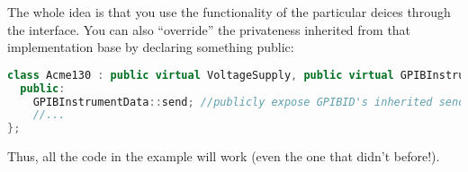 The whole idea is that you use the functionality of the particular deices through the interface. You can also ``override'' the privateness inherited from that implementation base by declaring something public:

\begin{lstlisting}[language=C++]
class Acme130 : public virtual VoltageSupply, public virtual GPIBInstrument, private GPIBInstrumentData {
  public:
    GPIBInstrumentData::send; //publicly expose GPIBID's inherited send function
    //...
};
\end{lstlisting}

Thus, all the code in the example will work (even the one that didn't before!).
